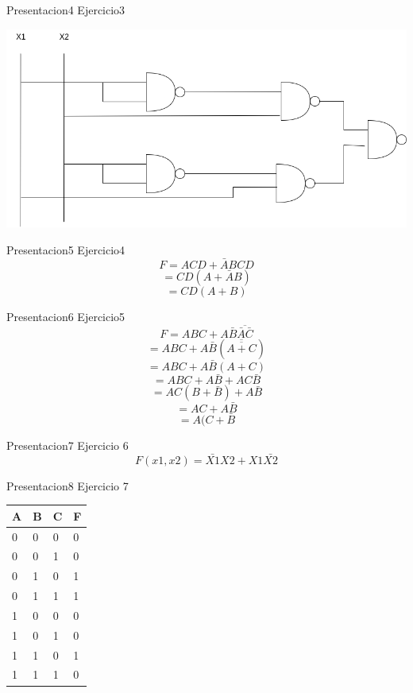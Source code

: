 \documentclass[presentation]{beamer}
\begin{document}
\begin{frame}[label={sec:org49b4636}]{Presentacion4}
Ejercicio3
\begin{center}
\includegraphics[width=.9\linewidth]{./diagrama.png}
\end{center}
\end{frame}

\begin{frame}[label={sec:org3a0ee33}]{Presentacion5}
Ejercicio4
$$F = ACD + \bar{A}BCD$$
$$  = CD(A+\bar{A}B)  $$
$$  = CD(A+B)         $$
\end{frame}

\begin{frame}[label={sec:org7269555}]{Presentacion6}
Ejercicio5
$$F = ABC + A\bar{B}\overline{\bar{A}\bar{C}}$$                                                        
$$  = ABC + A\bar{B}(\overline{\overline{A + C}})$$                                                        
$$  = ABC + A\bar{B}(A+C)$$
$$  = ABC + A\bar{B} + AC\bar{B}$$
$$  = AC(B + \bar{B}) + A\bar{B}$$
$$  = AC + A\bar{B}$$
$$  = A(C + \bar{B}$$
\end{frame}

\begin{frame}[label={sec:org63ff388}]{Presentacion7}
Ejercicio 6
$$F(x1,x2) = \bar{X1}X2 + X1\bar{X2}$$
\end{frame}

\begin{frame}[label={sec:orge9334e0}]{Presentacion8}
Ejercicio 7
\begin{center}
\begin{tabular}{|l|l|l|l|}
\hline
A & B & C & F \\
\hline
0 & 0 & 0 & 0 \\
\hline
0 & 0 & 1 & 0 \\
\hline
0 & 1 & 0 & 1 \\
\hline
0 & 1 & 1 & 1 \\
\hline
1 & 0 & 0 & 0 \\
\hline
1 & 0 & 1 & 0 \\
\hline
1 & 1 & 0 & 1 \\
\hline
1 & 1 & 1 & 0 \\
\hline
\end{tabular}
\end{center}
\end{frame}
\end{document}
